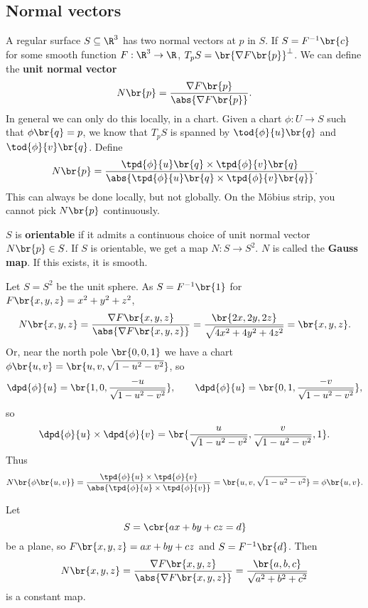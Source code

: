 \pagebreak

\subsection{Normal vectors}

A regular surface $ S \subseteq \R^3 $ has two normal vectors at $ p $ in $ S $. If $ S = F^{-1}\br{c} $ for some smooth function $ F : \R^3 \to \R $, $ T_pS = \br{\nabla F\br{p}}^\perp $. We can define the \textbf{unit normal vector}
$$ N\br{p} = \dfrac{\nabla F\br{p}}{\abs{\nabla F\br{p}}}. $$
In general we can only do this locally, in a chart. Given a chart $ \phi : U \to S $ such that $ \phi\br{q} = p $, we know that $ T_pS $ is spanned by $ \tod{\phi}{u}\br{q} $ and $ \tod{\phi}{v}\br{q} $. Define
$$ N\br{p} = \dfrac{\tpd{\phi}{u}\br{q} \times \tpd{\phi}{v}\br{q}}{\abs{\tpd{\phi}{u}\br{q} \times \tpd{\phi}{v}\br{q}}}. $$
This can always be done locally, but not globally. On the M\"obius strip, you cannot pick $ N\br{p} $ continuously.

\begin{definition}
$ S $ is \textbf{orientable} if it admits a continuous choice of unit normal vector $ N\br{p} \in S $. If $ S $ is orientable, we get a map $ N : S \to S^2 $. $ N $ is called the \textbf{Gauss map}. If this exists, it is smooth.
\end{definition}

\begin{example*}
Let $ S = S^2 $ be the unit sphere. As $ S = F^{-1}\br{1} $ for $ F\br{x, y, z} = x^2 + y^2 + z^2 $,
$$ N\br{x, y, z} = \dfrac{\nabla F\br{x, y, z}}{\abs{\nabla F\br{x, y, z}}} = \dfrac{\br{2x, 2y, 2z}}{\sqrt{4x^2 + 4y^2 + 4z^2}} = \br{x, y, z}. $$
Or, near the north pole $ \br{0, 0, 1} $ we have a chart $ \phi\br{u, v} = \br{u, v, \sqrt{1 - u^2 - v^2}} $, so
$$ \dpd{\phi}{u} = \br{1, 0, \dfrac{-u}{\sqrt{1 - u^2 - v^2}}}, \qquad \dpd{\phi}{u} = \br{0, 1, \dfrac{-v}{\sqrt{1 - u^2 - v^2}}}, $$
so
$$ \dpd{\phi}{u} \times \dpd{\phi}{v} = \br{\dfrac{u}{\sqrt{1 - u^2 - v^2}}, \dfrac{v}{\sqrt{1 - u^2 - v^2}}, 1}. $$
Thus
$$ N\br{\phi\br{u, v}} = \dfrac{\tpd{\phi}{u} \times \tpd{\phi}{v}}{\abs{\tpd{\phi}{u} \times \tpd{\phi}{v}}} = \br{u, v, \sqrt{1 - u^2 - v^2}} = \phi\br{u, v}. $$
\end{example*}

\begin{example*}
Let
$$ S = \cbr{ax + by + cz = d} $$
be a plane, so $ F\br{x, y, z} = ax + by + cz $ and $ S = F^{-1}\br{d} $. Then
$$ N\br{x, y, z} = \dfrac{\nabla F\br{x, y, z}}{\abs{\nabla F\br{x, y, z}}} = \dfrac{\br{a, b, c}}{\sqrt{a^2 + b^2 + c^2}} $$
is a constant map.
\end{example*}

